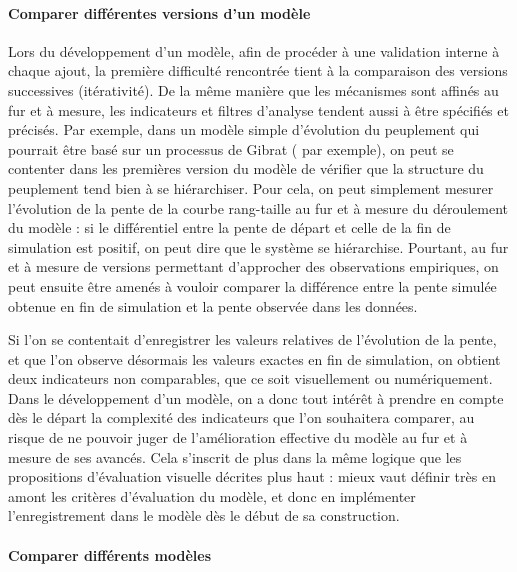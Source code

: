 \documentclass[a4paper, 12pt]{article}
\begin{document}
\paragraph{Comparer différentes versions d'un modèle}

Lors du développement d'un modèle, afin de procéder à une validation interne à chaque ajout, la première difficulté rencontrée tient à la comparaison des versions successives (itérativité).
De la même manière que les mécanismes sont affinés au fur et à mesure, les indicateurs et filtres d'analyse tendent aussi à être spécifiés et précisés.
Par exemple, dans un modèle simple d'évolution du peuplement qui pourrait être basé sur un processus de Gibrat (\textcite{cura_old_2017} par exemple), on peut se contenter dans les premières version du modèle de vérifier que la structure du peuplement tend bien à se hiérarchiser.
Pour cela, on peut simplement mesurer l'évolution de la pente de la courbe rang-taille au fur et à mesure du déroulement du modèle : si le différentiel entre la pente de départ et celle de la fin de simulation est positif, on peut dire que le système se hiérarchise.
Pourtant, au fur et à mesure de versions permettant d'approcher des observations empiriques, on peut ensuite être amenés à vouloir comparer la différence entre la pente simulée obtenue en fin de simulation et la pente observée dans les données.

Si l'on se contentait d'enregistrer les valeurs relatives de l'évolution de la pente, et que l'on observe désormais les valeurs exactes en fin de simulation, on obtient deux indicateurs non comparables, que ce soit visuellement ou numériquement.
Dans le développement d'un modèle, on a donc tout intérêt à prendre en compte dès le départ la complexité des indicateurs que l'on souhaitera comparer, au risque de ne pouvoir juger de l'amélioration effective du modèle au fur et à mesure de ses avancés.
Cela s'inscrit de plus dans la même logique que les propositions d'évaluation visuelle décrites plus haut : mieux vaut définir très en amont les critères d'évaluation du modèle, et donc en implémenter l'enregistrement dans le modèle dès le début de sa construction.

\paragraph{Comparer différents modèles}
\end{document}
